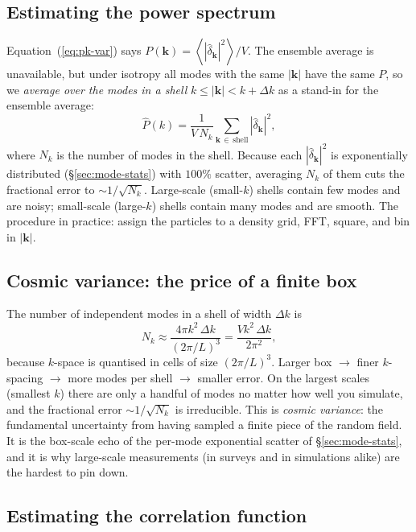 \documentclass[12pt]{article}
\newcommand{\bk}{\mathbf{k}}
\newcommand{\avg}[1]{\left\langle #1 \right\rangle}
\begin{document}
\subsection{Estimating the power spectrum}
\label{sec:estimate-pk}

Equation~(\ref{eq:pk-var}) says $P(\bk) = \avg{|\hat\delta_\bk|^2}/V$.
The ensemble average is unavailable, but under isotropy all modes with
the same $|\bk|$ have the same $P$, so we \emph{average over the modes in
a shell} $k \le |\bk| < k + \Delta k$ as a stand-in for the ensemble
average:
\begin{equation}
  \hat P(k) = \frac{1}{V\,N_k}\sum_{\bk\,\in\,\text{shell}} |\hat\delta_\bk|^2,
  \label{eq:pk-estimator}
\end{equation}
where $N_k$ is the number of modes in the shell.  Because each
$|\hat\delta_\bk|^2$ is exponentially distributed
(\S\ref{sec:mode-stats}) with $100\%$ scatter, averaging $N_k$ of them
cuts the fractional error to $\sim 1/\sqrt{N_k}$.  Large-scale (small-$k$)
shells contain few modes and are noisy; small-scale (large-$k$) shells
contain many modes and are smooth.  The procedure in practice: assign the
particles to a density grid, FFT, square, and bin in $|\bk|$.

\subsection{Cosmic variance: the price of a finite box}
\label{sec:cosmicvar}

The number of independent modes in a shell of width $\Delta k$ is
\begin{equation}
  N_k \approx \frac{4\pi k^2\,\Delta k}{(2\pi/L)^3}
            = \frac{V k^2\,\Delta k}{2\pi^2},
\end{equation}
because $k$-space is quantised in cells of size $(2\pi/L)^3$.  Larger box
$\to$ finer $k$-spacing $\to$ more modes per shell $\to$ smaller error.
On the largest scales (smallest $k$) there are only a handful of modes no
matter how well you simulate, and the fractional error $\sim
1/\sqrt{N_k}$ is irreducible.  This is \emph{cosmic variance}: the
fundamental uncertainty from having sampled a finite piece of the random
field.  It is the box-scale echo of the per-mode exponential scatter of
\S\ref{sec:mode-stats}, and it is why large-scale measurements (in
surveys and in simulations alike) are the hardest to pin down.

\subsection{Estimating the correlation function}
\label{sec:estimate-xi}
\end{document}
